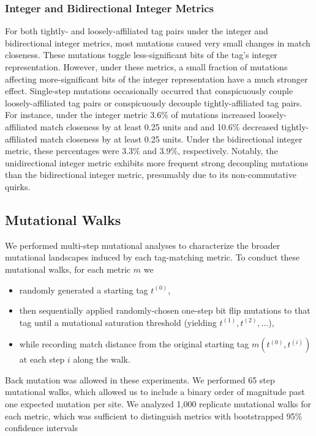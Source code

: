 \subsubsection{Integer and Bidirectional Integer Metrics}

For both tightly- and loosely-affiliated tag pairs under the integer and bidirectional integer metrics, most mutations caused very small changes in match closeness.
These mutations toggle less-significant bits of the tag's integer representation.
However, under these metrics, a small fraction of mutations affecting more-significant bits of the integer representation have a much stronger effect.
Single-step mutations occasionally occurred that conspicuously couple loosely-affiliated tag pairs or conspicuously decouple tightly-affiliated tag pairs.
For instance, under the integer metric 3.6\% of mutations increased loosely-affiliated match closeness by at least 0.25 units and and 10.6\% decreased tightly-affiliated match closeness by at least 0.25 units.
Under the bidirectional integer metric, these percentages were 3.3\% and 3.9\%, respectively.
Notably, the unidirectional integer metric exhibits more frequent strong decoupling mutations than the bidirectional integer metric, presumably due to its non-commutative quirks.

\subsection{Mutational Walks} \label{sec:mutational_walks}



We performed multi-step mutational analyses to characterize the broader mutational landscapes induced by each tag-matching metric.
To conduct these mutational walks, for each metric $m$ we
\begin{itemize}
    \item randomly generated a starting tag $t^{(0)}$,
    \item then sequentially applied randomly-chosen one-step bit flip mutations to that tag until a mutational saturation threshold (yielding $t^{(1)}, t^{(2)}, ...$),
    \item while recording match distance from the original starting tag $m(t^{(0)}, t^{(i)})$ at each step $i$ along the walk.
\end{itemize}
Back mutation was allowed in these experiments.
We performed 65 step mutational walks, which allowed us to include a binary order of magnitude past one expected mutation per site.
We analyzed 1,000 replicate mutational walks for each metric, which was sufficient to distinguish metrics with bootstrapped 95\% confidence intervals

